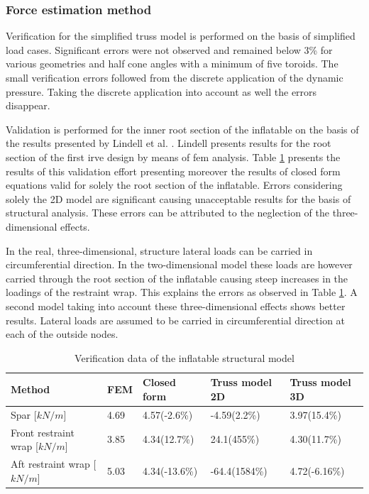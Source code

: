 \subsubsection{Force estimation method}

Verification for the simplified truss model is performed on the basis of simplified load cases. Significant errors were not observed and remained below 3\% for various geometries and half cone angles with a minimum of five toroids. The small verification errors followed from the discrete application of the dynamic pressure. Taking the discrete application into account as well the errors disappear.

Validation is performed for the inner root section of the inflatable on the basis of the results presented by Lindell et al. \cite{Lindell2006}. Lindell presents results for the root section of the first \gls{irve} design by means of \gls{fem} analysis. Table \ref{tab:struc_val} presents the results of this validation effort presenting moreover the results of closed form equations valid for solely the root section of the inflatable. Errors considering solely the 2D model are significant causing unacceptable results for the basis of structural analysis. These errors can be attributed to the neglection of the three-dimensional effects. 

In the real, three-dimensional, structure lateral loads can be carried in circumferential direction. In the two-dimensional model these loads are however carried through the root section of the inflatable causing steep increases in the loadings of the restraint wrap. This explains the errors as observed in Table \ref{tab:struc_val}. A second model taking into account these three-dimensional effects shows better results. Lateral loads are assumed to be carried in circumferential direction at each of the outside nodes. 

\begin{table}[h]
\centering
\caption{Verification data of the inflatable structural model}
\label{tab:struc_val} 
\begin{tabular}{|l|l|l|l|l|} \hline
Method                            & FEM \cite{Lindell2006} & Closed form \cite{Lindell2006} & Truss model 2D & Truss model 3D \\ \hline \hline
Spar [$kN/m$]                 & 4.69                     & 4.57(-2.6\%)                     & -4.59(2.2\%)   & 3.97(15.4\%)   \\ \hline
Front restraint wrap [$kN/m$] & 3.85                     & 4.34(12.7\%)                     & 24.1(455\%)    & 4.30(11.7\%)   \\ \hline
Aft restraint wrap [$kN/m$]   & 5.03                     & 4.34(-13.6\%)                    & -64.4(1584\%)  & 4.72(-6.16\%) \\ \hline
\end{tabular}
\end{table}

